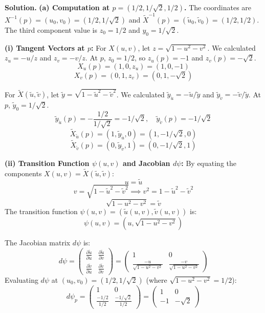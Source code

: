 \documentclass[12pt, a4paper, oneside]{article}
\newenvironment{solution}
  {\par\noindent\textbf{Solution. }\newline}
  {\par}
\begin{document}
\begin{solution}
\textbf{(a) Computation at $p=(1/2, 1/\sqrt{2}, 1/2)$.}
The coordinates are $X^{-1}(p) = (u_0, v_0) = (1/2, 1/\sqrt{2})$ and $\tilde{X}^{-1}(p) = (\tilde{u}_0, \tilde{v}_0) = (1/2, 1/2)$. The third component value is $z_0 = 1/2$ and $y_0 = 1/\sqrt{2}$.

\textbf{(i) Tangent Vectors at $p$:}
For $X(u, v)$, let $z = \sqrt{1-u^2-v^2}$. We calculated $z_u = -u/z$ and $z_v = -v/z$.
At $p$, $z_0=1/2$, so $z_u(p) = -1$ and $z_v(p) = -\sqrt{2}$.
$$X_u(p) = \left(1, 0, z_u\right) = (1, 0, -1)$$
$$X_v(p) = \left(0, 1, z_v\right) = (0, 1, -\sqrt{2})$$

For $\tilde{X}(\tilde{u}, \tilde{v})$, let $\tilde{y} = \sqrt{1-\tilde{u}^2-\tilde{v}^2}$. We calculated $\tilde{y}_{\tilde{u}} = -\tilde{u}/\tilde{y}$ and $\tilde{y}_{\tilde{v}} = -\tilde{v}/\tilde{y}$.
At $p$, $\tilde{y}_0=1/\sqrt{2}$.
$$\tilde{y}_{\tilde{u}}(p) = -\frac{1/2}{1/\sqrt{2}} = -1/\sqrt{2}, \quad \tilde{y}_{\tilde{v}}(p) = -1/\sqrt{2}$$
$$\tilde{X}_{\tilde{u}}(p) = \left(1, \tilde{y}_{\tilde{u}}, 0\right) = \left(1, -1/\sqrt{2}, 0\right)$$
$$\tilde{X}_{\tilde{v}}(p) = \left(0, \tilde{y}_{\tilde{v}}, 1\right) = \left(0, -1/\sqrt{2}, 1\right)$$

\textbf{(ii) Transition Function $\psi(u, v)$ and Jacobian $d\psi$:}
By equating the components $X(u, v) = \tilde{X}(\tilde{u}, \tilde{v})$:
$$u = \tilde{u}$$$$v = \sqrt{1-\tilde{u}^2-\tilde{v}^2} \implies v^2 = 1-\tilde{u}^2-\tilde{v}^2$$$$\sqrt{1-u^2-v^2} = \tilde{v}$$The transition function $\psi(u, v) = (\tilde{u}(u, v), \tilde{v}(u, v))$ is:$$\psi(u, v) = \left(u, \sqrt{1-u^2-v^2}\right)$$

The Jacobian matrix $d\psi$ is:
$$d\psi = \begin{pmatrix} \frac{\partial \tilde{u}}{\partial u} & \frac{\partial \tilde{u}}{\partial v} \\ \frac{\partial \tilde{v}}{\partial u} & \frac{\partial \tilde{v}}{\partial v} \end{pmatrix} = \begin{pmatrix} 1 & 0 \\ \frac{-u}{\sqrt{1-u^2-v^2}} & \frac{-v}{\sqrt{1-u^2-v^2}} \end{pmatrix}$$Evaluating $d\psi$ at $(u_0, v_0) = (1/2, 1/\sqrt{2})$ (where $\sqrt{1-u^2-v^2} = 1/2$):$$d\psi_p = \begin{pmatrix} 1 & 0 \\ \frac{-1/2}{1/2} & \frac{-1/\sqrt{2}}{1/2} \end{pmatrix} = \begin{pmatrix} 1 & 0 \\ -1 & -\sqrt{2} \end{pmatrix}$$


\end{solution}
\end{document}
